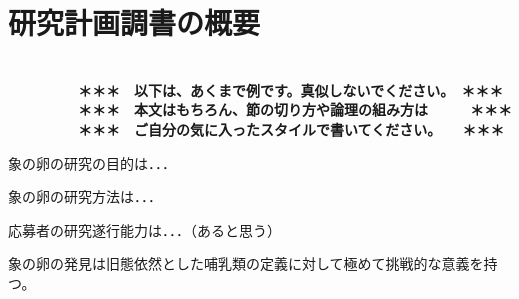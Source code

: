 
\section{研究計画調書の概要}

\JSPSInstructions	%

\textbf{\\　　　　　＊＊＊　以下は、あくまで例です。真似しないでください。　＊＊＊\\
　　　　　＊＊＊　本文はもちろん、節の切り方や論理の組み方は　　　＊＊＊\\
　　　　　＊＊＊　ご自分の気に入ったスタイルで書いてください。　　＊＊＊}

	象の卵の研究の目的は．．．	

	象の卵の研究方法は．．．	

	応募者の研究遂行能力は．．．（あると思う）

	象の卵の発見は旧態依然とした哺乳類の定義に対して極めて挑戦的な意義を持つ。

	



